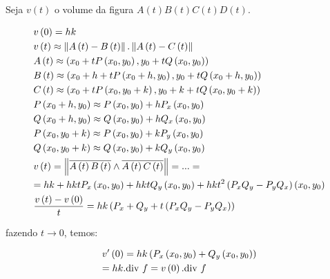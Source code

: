 \documentclass[11pt, oneside, a4paper]{gsm-l}
\begin{document}
\begin{sol}

Seja $v\left( t \right)$ o volume da figura $A(t)B(t)C(t)D(t)$.

\[
\begin{gathered}
  v\left( 0 \right) = hk \hfill \\
  v\left( t \right) \approx \left\| {A\left( t \right) - B\left( t \right)} \right\|.\left\| {A\left( t \right) - C\left( t \right)} \right\| \hfill \\
  A\left( t \right) \approx \left( {x_0  + tP\left( {x_0 ,y_0 } \right),y_0  + tQ\left( {x_0 ,y_0 } \right)} \right) \hfill \\
  B\left( t \right) \approx \left( {x_0  + h + tP\left( {x_0  + h,y_0 } \right),y_0  + tQ\left( {x_0  + h,y_0 } \right)} \right) \hfill \\
  C\left( t \right) \approx \left( {x_0  + tP\left( {x_0 ,y_0  + k} \right),y_0  + k + tQ\left( {x_0 ,y_0  + k} \right)} \right) \hfill \\
  P\left( {x_0  + h,y_0 } \right) \approx P\left( {x_0 ,y_0 } \right) + hP_x \left( {x_0 ,y_0 } \right) \hfill \\
  Q\left( {x_0  + h,y_0 } \right) \approx Q\left( {x_0 ,y_0 } \right) + hQ_x \left( {x_0 ,y_0 } \right) \hfill \\
  P\left( {x_0 ,y_0  + k} \right) \approx P\left( {x_0 ,y_0 } \right) + kP_y \left( {x_0 ,y_0 } \right) \hfill \\
  Q\left( {x_0 ,y_0  + k} \right) \approx Q\left( {x_0 ,y_0 } \right) + kQ_y \left( {x_0 ,y_0 } \right) \hfill \\
  v\left( t \right) = \left\| {\overline {A\left( t \right)B\left( t \right)}  \wedge \overline {A\left( t \right)C\left( t \right)} } \right\| = ... =  \hfill \\
   = hk + hktP_x \left( {x_0 ,y_0 } \right) + hktQ_y \left( {x_0 ,y_0 } \right) + hkt^2 \left( {P_x Q_y  - P_y Q_x } \right)\left( {x_0 ,y_0 } \right) \hfill \\
  \frac{{v\left( t \right) - v\left( 0 \right)}}
{t} = hk\left( {P_x  + Q_y  + t\left( {P_x Q_y  - P_y Q_x } \right)} \right) \hfill \\
\end{gathered}
\]

fazendo $t \to 0$, temos:

\[
\begin{gathered}
  v'\left( 0 \right) = hk\left( {P_x \left( {x_0 ,y_0 } \right) + Q_y \left( {x_0 ,y_0 } \right)} \right) \hfill \\
   = hk.{\text{div }}f = v\left( 0 \right).{\text{div }}f \hfill \\
\end{gathered}
\]

\end{sol}
\end{document}
